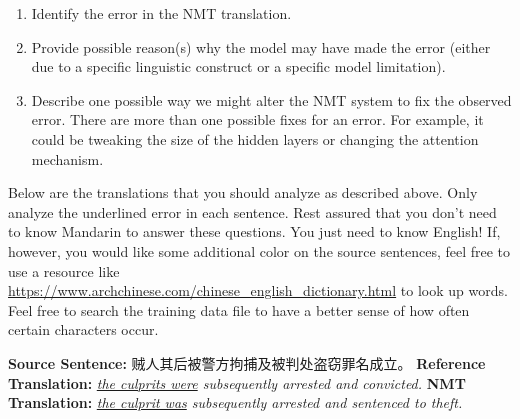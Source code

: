 \begin{parts}
    \begin{enumerate}
        \item Identify the error in the NMT translation.
        \item Provide possible reason(s) why the model may have made the error (either due to a specific linguistic construct or a specific model limitation).
        \item Describe one possible way we might alter the NMT system to fix the observed error. There are more than one possible fixes for an error. For example, it could be tweaking the size of the hidden layers or changing the attention mechanism.
    \end{enumerate}
    
    Below are the translations that you should analyze as described above. Only analyze the underlined error in each sentence. Rest assured that you don't need to know Mandarin to answer these questions. You just need to know English! If, however, you would like some additional color on the source sentences, feel free to use a resource like \url{https://www.archchinese.com/chinese_english_dictionary.html} to look up words. Feel free to search the training data file to have a better sense of how often certain characters occur.

    \begin{subparts}
        \subpart[2]
        \textbf{Source Sentence:} 贼人其后被警方拘捕及被判处盗窃罪名成立。 \newline
        \textbf{Reference Translation:} \textit{\underline{the culprits were} subsequently arrested and convicted.}\newline
        \textbf{NMT Translation:} \textit{\underline{the culprit was} subsequently arrested and sentenced to theft.}
        



\end{subparts}
\end{parts}
